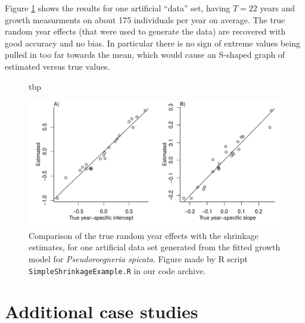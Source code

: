 \documentclass[12pt]{article}
\begin{document}
Figure \ref{fig:compareShrinkage} shows the results for one artificial ``data'' set, having $T=22$ years and growth measurments on 
about 175 individuals per year on average. The true random year effects (that were used to generate the data) are recovered
with good accuracy and no bias. In particular there is no sign of extreme values being pulled in too far
towards the mean, which would cause an S-shaped graph of estimated versus true values. 

\begin{figure}{tbp}
\centerline{\includegraphics[width=\textwidth]{figures/SimpleShrinkage.pdf}}
\caption{Comparison of the true random year effects with the shrinkage estimates, for one artificial data set
generated from the fitted growth model for  \emph{Pseudoroegneria spicata}. Figure made by R script 
\texttt{SimpleShrinkageExample.R} in our code archive.} 
\label{fig:compareShrinkage}
\end{figure}


\section{Additional case studies}
\label{sec:moreCases}
\end{document}
